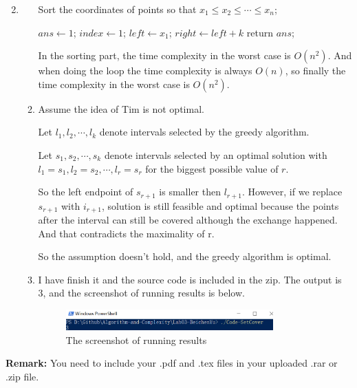 \documentclass[12pt,a4paper]{article}
\makeatletter
\newtheorem*{solution}{Solution}
\theoremstyle{definition}
\renewenvironment{solution}[1][Solution] {\par\pushQED{\qed}\normalfont\topsep6\p@\@plus6\p@\relax\trivlist\item[\hskip\labelsep\bfseries#1\@addpunct{.}]\ignorespaces}{\popQED\endtrivlist\@endpefalse} \makeatother
\makeatother
\begin{document}
\begin{enumerate}
\begin{solution}
\begin{enumerate}
\begin{minipage}[t]{0.88\textwidth}
\begin{algorithm}[H]
		Sort the coordinates of points so that $x_1\leqslant x_2\leqslant \cdots \leqslant x_n$;
		
		$ans \leftarrow 1$; $index \leftarrow 1$; $left \leftarrow x_1$; $right \leftarrow left+k$\;
		return $ans$;
	\end{algorithm}
	
	In the sorting part, the time complexity in the worst case is $O(n^2)$. And when doing the loop the time complexity is always $O(n)$, so finally the time complexity in the worst case is $O(n^2)$.
	\end{minipage}
	
	\item Assume the idea of Tim is not optimal.
	        
	      Let $l_1,l_2,\cdots,l_k$ denote intervals selected by the greedy algorithm. 
	      
	      Let $s_1,s_2,\cdots,s_k$ denote intervals selected by an optimal solution with $l_1=s_1,l_{2}=s_{2},\cdots,l_{r}=s_r$ for the biggest possible value of $r$.
	      
	      So the left endpoint of $s_{r+1}$ is smaller then $l_{r+1}$. However, if we replace $s_{r+1}$ with $i_{r+1}$, solution is still feasible and optimal because the points after the interval can still be covered although the exchange happened. And that contradicts the maximality of r. 
	      
	      So the assumption doesn't hold, and the greedy algorithm is optimal.
	      
	\item I have finish it and the source code is included in the zip. The output is 3, and the screenshot of running results is below.
	
	\begin{figure}[H]
    \centering
    \includegraphics[width=0.8\textwidth]{result.png}
    \caption{The screenshot of running results}
\end{figure}
	
	
        \end{enumerate}
    \end{solution}

\end{enumerate}



\vspace{20pt}

\textbf{Remark:} You need to include your .pdf and .tex files in your uploaded .rar or .zip file.

\end{document}
